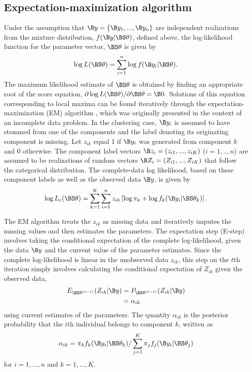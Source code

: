 \subsection{Expectation-maximization algorithm}\label{subsec:em}
Under the assumption that $\B y = \{\B y_{1},...,\B y_{n}\}$ are independent realizations from the mixture distribution, $f(\B y | \BS\theta)$, defined above, the log-likelihood function for the parameter vector, $\BS \theta$ is given by
$$\log L(\BS\theta)=\sum^{n}_{i=1}\log f(\B y_{i}|\BS \theta).$$
The maximum likelihood estimate of $\BS\theta$ is obtained by finding an appropriate root of the score equation, $\partial \log L(\BS\theta)/\partial \BS\theta=\B 0.$ Solutions of this equation corresponding to local maxima can be found iteratively through the expectation-maximization (EM) algorithm \cite{dempster1977}, which was originally presented in the context of an incomplete data problem. In the clustering case, $\B y_{i}$ is assumed to have stemmed from one of the components and the label denoting its originating component is missing. Let $z_{ik}$ equal 1 if $\B y_{i}$ was generated from component $k$ and 0 otherwise. The component label vectors $\B z_{i}=(z_{i1},...,z_{iK})$ ($i=1,..,n$) are assumed to be realizations of random vectors $\B Z_{i}=(Z_{i1},...,Z_{iK})$ that follow the categorical distribution. The complete-data log likelihood, based on these component labels as well as the observed data $\B y$, is given by
$$\log L_{c}(\BS \theta) =  \sum^{K}_{k=1}\sum^{n}_{i=1}z_{ik}\left[\log \pi_{k}+\log f_{k}(\B y_{i}|\BS\theta_k)\right].$$

The EM algorithm treats the $z_{ik}$ as missing data and iteratively imputes the missing values and then  estimates the parameters. The expectation step (E-step) involves taking the conditional expectation of the complete log-likelihood, given the data $\B y$ and the current value of the parameter estimates. Since the complete log-likelihood is linear in the unobserved data $z_{ik}$, this step on the $t$th iteration simply involves calculating the conditional expectation of $Z_{ik}$ given the observed data,
\begin{align*}
E_{\BS\theta^{(t-1)}}( Z_{ik}|\B y) &= P_{\BS\theta^{(t-1)}}( Z_{ik}|\B y)\\
&=\alpha_{ik}
\end{align*}
using current estimates of the parameters. The quantity $\alpha_{ik}$ is the posterior probability that the $i$th individual belongs to component $k$, written as
$$\alpha_{ik}=\pi_{k}f_{k}(\B y_{i}|\BS\theta_{k})/\sum_{j=1}^{K}\pi_{j}f_{j}(\B y_{i}|\BS \theta_{j})$$
for $i=1,...,n$ and $k=1,...,K$.

